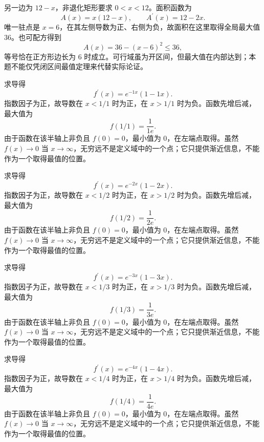 \documentclass[12pt,fontset=fandol]{ctexart}
\begin{document}
\begin{solve}\label{ans:c11q13}
另一边为 $12-x$，非退化矩形要求 $0<x<12$。面积函数为
\[
A(x)=x(12-x),\qquad A^{\prime}(x)=12-2x.
\]
唯一驻点是 $x=6$，在其左侧导数为正、右侧为负，故面积在这里取得全局最大值 $36$。也可配方得到
\[
A(x)=36-(x-6)^2\le 36,
\]
等号恰在正方形边长为 $6$ 时成立。可行域虽为开区间，但最大值在内部达到；本题不能仅凭闭区间最值定理来代替实际论证。
\end{solve}

\begin{solve}\label{ans:c11q14}
求导得
\[
f^{\prime}(x)=e^{-1x}(1-1x).
\]
指数因子为正，故导数在 $x<1/1$ 时为正，在 $x>1/1$ 时为负。函数先增后减，最大值为
\[
f(1/1)=\frac1{1e}.
\]
由于函数在该半轴上非负且 $f(0)=0$，最小值为 $0$，在左端点取得。虽然 $f(x)\to0$ 当 $x\to\infty$，无穷远不是定义域中的一个点；它只提供渐近信息，不能作为一个取得最值的位置。
\end{solve}

\begin{solve}\label{ans:c11q15}
求导得
\[
f^{\prime}(x)=e^{-2x}(1-2x).
\]
指数因子为正，故导数在 $x<1/2$ 时为正，在 $x>1/2$ 时为负。函数先增后减，最大值为
\[
f(1/2)=\frac1{2e}.
\]
由于函数在该半轴上非负且 $f(0)=0$，最小值为 $0$，在左端点取得。虽然 $f(x)\to0$ 当 $x\to\infty$，无穷远不是定义域中的一个点；它只提供渐近信息，不能作为一个取得最值的位置。
\end{solve}

\begin{solve}\label{ans:c11q16}
求导得
\[
f^{\prime}(x)=e^{-3x}(1-3x).
\]
指数因子为正，故导数在 $x<1/3$ 时为正，在 $x>1/3$ 时为负。函数先增后减，最大值为
\[
f(1/3)=\frac1{3e}.
\]
由于函数在该半轴上非负且 $f(0)=0$，最小值为 $0$，在左端点取得。虽然 $f(x)\to0$ 当 $x\to\infty$，无穷远不是定义域中的一个点；它只提供渐近信息，不能作为一个取得最值的位置。
\end{solve}

\begin{solve}\label{ans:c11q17}
求导得
\[
f^{\prime}(x)=e^{-4x}(1-4x).
\]
指数因子为正，故导数在 $x<1/4$ 时为正，在 $x>1/4$ 时为负。函数先增后减，最大值为
\[
f(1/4)=\frac1{4e}.
\]
由于函数在该半轴上非负且 $f(0)=0$，最小值为 $0$，在左端点取得。虽然 $f(x)\to0$ 当 $x\to\infty$，无穷远不是定义域中的一个点；它只提供渐近信息，不能作为一个取得最值的位置。
\end{solve}
\end{document}
